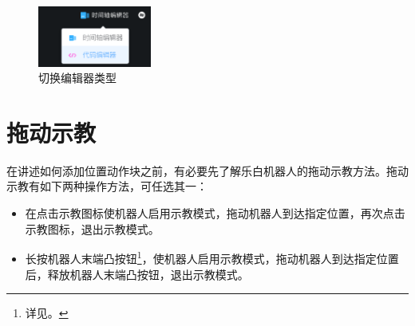 \begin{figure}[H]
	\centering
	\includegraphics[height=2cm]{screen/3-3.png}
	\caption{切换编辑器类型}
	\label{fig:切换编辑器类型}
\end{figure}





\section{拖动示教}
在讲述如何添加位置动作块之前，有必要先了解乐白机器人的拖动示教方法。拖动示教有如下两种操作方法，可任选其一：
\begin{itemize}
	\item 在\LM 点击示教图标使机器人启用示教模式，拖动机器人到达指定位置，再次点击示教图标，退出示教模式。
	\item 长按机器人末端凸按钮\footnote{详见。}，使机器人启用示教模式，拖动机器人到达指定位置后，释放机器人末端凸按钮，退出示教模式。
\end{itemize}



